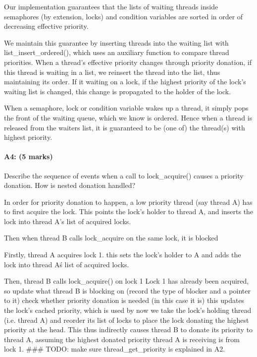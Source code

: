 Our implementation guarantees that the lists of waiting threads inside semaphores (by extension, locks) and condition variables are sorted in order of decreasing effective priority.

We maintain this guarantee by inserting threads into the waiting list with list\_insert\_ordered(), which uses an auxiliary function to compare thread priorities.
When a thread's effective priority changes through priority donation, if this thread is waiting in a list, we reinsert the thread into the list, thus maintaining its order. If it waiting on a lock, if the highest priority of the lock's waiting list is changed, this change is propagated to the holder of the lock.

When a semaphore, lock or condition variable wakes up a thread, it simply pops the front of the waiting queue, which we know is ordered. Hence when a thread is released from the waiters list, it is guaranteed to be (one of) the thread(s) with highest priority.

\paragraph{A4: (5 marks)}
Describe the sequence of events when a call to lock\_acquire() causes a priority donation.  How is nested donation handled?

In order for priority donation to happen, a low priority thread (say thread A) has to first acquire the lock. This points the lock's holder to thread A, and inserts the lock into thread A's list of acquired locks.

Then when thread B calls lock\_acquire on the same lock, it is blocked

  Firstly, thread A acquires lock 1.
    this sets the lock's holder to A and adds the lock into thread A\'s list of acquired locks.

  Then, thread B calls lock\_acquire() on lock 1
  Lock 1 has already been acquired, so
    update what thread B is blocking on (record the type of blocker and a pointer to it)
    check whether priority donation is needed (in this case it is)
      this updates the lock's cached priority, which is used by 
    now we take the lock's holding thread (i.e. thread A) and reorder its list of locks to place the lock donating the highest priority at the head. This thus indirectly causes thread B to donate its priority to thread A, assuming the highest donated priority thread A is receiving is from lock 1.
    \#\#\# TODO: make sure thread\_get\_priority is explained in A2.


